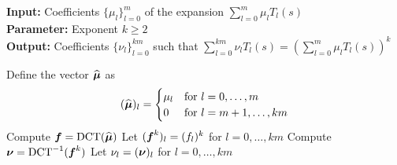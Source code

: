 \hspace*{\algorithmicindent} \textbf{Input:} Coefficients $\{ \mu_l \}_{l=0}^{m}$ of the expansion $\sum_{l=0}^{m} \mu_l T_l(s)$ \\
\hspace*{\algorithmicindent} \textbf{Parameter:} Exponent $k \geq 2$ \\
\hspace*{\algorithmicindent} \textbf{Output:} Coefficients $\{ \nu_l \}_{l=0}^{km}$ such that $\sum_{l=0}^{km} \nu_l T_l(s) = (\sum_{l=0}^{m} \mu_l T_l(s))^k$
\begin{algorithmic}[1]
    \State Define the vector $\widehat{\boldsymbol{\mu}}$ as
        \begin{equation}
            (\widehat{\boldsymbol{\mu}})_l = \begin{cases} \mu_l &\text{for $l=0, \dots, m$} \\
                                                     0 &\text{for $l=m+1, \dots, km$} \end{cases}
        \end{equation}
    \State Compute $\boldsymbol{f} = \operatorname{DCT}(\widehat{\boldsymbol{\mu}})$
    \State Let $(\boldsymbol{f}^{k})_l = (f_l)^k$ for $l=0, \dots, km$
    \State Compute $\boldsymbol{\nu} = \operatorname{DCT}^{-1}(\boldsymbol{f}^{k})$
    \State Let $\nu_l = (\boldsymbol{\nu})_l$ for $l=0, \dots, km$
\end{algorithmic}
